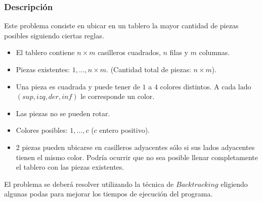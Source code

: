 \documentclass[11pt, a4paper, twoside]{article}
\begin{document}
{}

\subsubsection{Descripción}

Este problema consiste en ubicar en un tablero la mayor cantidad de piezas
posibles siguiendo ciertas reglas.

\begin{itemize}   
	\item El tablero contiene $n \times m$ casilleros cuadrados, $n$ filas y $m$
	columnas.

	\item Piezas existentes: $1,...,n \times m$. (Cantidad total de 
	piezas: $n \times m$).

	\item Una pieza es cuadrada y puede tener de $1$ a $4$ colores distintos. 
	A cada lado $(sup, izq, der, inf)$ le corresponde un color. 

	\item Las piezas no se pueden rotar.

	\item Colores posibles: $1,...,c$ ($c$ entero positivo).

	\item 2 piezas pueden ubicarse en casilleros adyacentes sólo si sus lados 
	adyacentes tienen el mismo color. Podría ocurrir que no sea posible 
	llenar completamente el tablero con las piezas existentes. 



\end{itemize} 

El problema se deberá resolver utilizando la técnica de $Backtracking$
eligiendo algunas podas para mejorar los tiempos de ejecución del programa.

\end{document}
